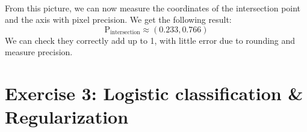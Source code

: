 \documentclass[a4paper, 10pt]{article}
\begin{document}
\\
From this picture, we can now measure the coordinates of the intersection point and the axis with pixel precision.
We get the following result:
$$
\text{P}_\text{intersection} \approx (0.233, 0.766)
$$
We can check they correctly add up to 1, with little error due to rounding and measure precision.

\section{Exercise 3: Logistic classification \& Regularization}
\end{document}
